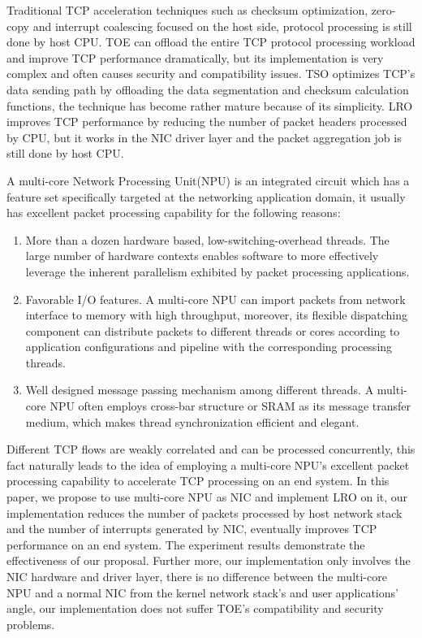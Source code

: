 \documentclass[conference]{IEEEtran}
\begin{document}
Traditional TCP acceleration techniques such as checksum optimization\cite{braden1989computing}\cite{mallory1990incremental}\cite{rijsinghani1994computation}\cite{kleinpaste1995software}, zero-copy\cite{chu1996zero} and interrupt coalescing\cite{dong2011optimizing} focused on the host side, protocol processing is still done by host CPU. TOE\cite{yeh2002introduction} can offload the entire TCP protocol processing workload and improve TCP performance dramatically, but its implementation is very complex and often causes security and compatibility issues\cite{mogul2003tcp}. TSO\cite{connery1999offload} optimizes TCP's data sending path by offloading the data segmentation and checksum calculation functions, the technique has become rather mature because of its simplicity. LRO\cite{grossman2005large} improves TCP performance by reducing the number of packet headers processed by CPU, but it works in the NIC driver layer and the packet aggregation job is still done by host CPU.

A multi-core Network Processing Unit(NPU) is an integrated circuit which has a feature set specifically targeted at the networking application domain, it usually has excellent packet processing capability for the following reasons:
\begin{enumerate}
\item More than a dozen hardware based, low-switching-overhead threads. The large number of hardware contexts enables software to more effectively leverage the inherent parallelism exhibited by packet processing applications.
\item Favorable I/O features. A multi-core NPU can import packets from network interface to memory with high throughput, moreover, its flexible dispatching component can distribute packets to different threads or cores according to application configurations and pipeline with the corresponding processing threads.
\item Well designed message passing mechanism among different threads. A multi-core NPU often employs cross-bar structure or SRAM as its message transfer medium, which makes thread synchronization efficient and elegant.
\end{enumerate}

Different TCP flows are weakly correlated and can be processed concurrently, this fact naturally leads to the idea of employing a multi-core NPU's excellent packet processing capability to accelerate TCP processing on an end system. In this paper, we propose to use multi-core NPU as NIC and implement LRO on it, our implementation reduces the number of packets processed by host network stack and the number of interrupts generated by NIC, eventually improves TCP performance on an end system. The experiment results demonstrate the effectiveness of our proposal. Further more, our implementation only involves the NIC hardware and driver layer, there is no difference between the multi-core NPU and a normal NIC from the kernel network stack's and user applications' angle, our implementation does not suffer TOE's compatibility and security problems.
\end{document}
